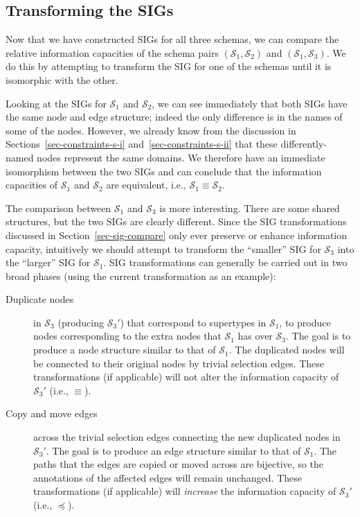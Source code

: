 \documentclass{sig-alternate-05-2015}
\newcounter{constraint}
\newcommand{\SC}[1]{\ensuremath{\mathcal{S}_{#1}}}
\newcommand{\Equivalent}[2]{\ensuremath{#1 \equiv #2}}
\begin{document}




\subsection{Transforming the SIGs}
\label{sec-transforming}

\noindent Now that we have constructed SIGs for all three schemas, we can compare the relative information capacities of the schema pairs \((\SC{1}, \SC{2})\) and \((\SC{1}, \SC{3})\). We do this by attempting to transform the SIG for one of the schemas until it is isomorphic with the other.

Looking at the SIGs for \(\SC{1}\) and \(\SC{2}\), we can see immediately that both SIGs have the same node and edge structure; indeed the only difference is in the names of some of the nodes. However, we already know from the discussion in Sections~\ref{sec-constraints-s-i} and~\ref{sec-constraints-s-ii} that these differently-named nodes represent the same domains. We therefore have an immediate isomorphism between the two SIGs and can conclude that the information capacities of \(\SC{1}\) and \(\SC{2}\) are equivalent, i.e., \(\Equivalent{\SC{1}}{\SC{2}}\).

The comparison between \(\SC{1}\) and \(\SC{3}\) is more interesting. There are some shared structures, but the two SIGs are clearly different. Since the SIG transformations discussed in Section~\ref{sec-sig-compare} only ever preserve or enhance information capacity, intuitively we should attempt to transform the ``smaller'' SIG for \(\SC{3}\) into the ``larger'' SIG for \(\SC{1}\). SIG transformations can generally be carried out in two broad phases (using the current transformation as an example):
\begin{description}

    \item[Duplicate nodes] in \(\SC{3}\) (producing \(\SC{3}'\)) that correspond to supertypes in \(\SC{1}\), to produce nodes corresponding to the extra nodes that \(\SC{1}\) has over \(\SC{3}\). The goal is to produce a node structure similar to that of \(\SC{1}\). The duplicated nodes will be connected to their original nodes by trivial selection edges. These transformations (if applicable) will not alter the information capacity of \(\SC{3}'\) (i.e., \(\equiv\)).
    
    \item[Copy and move edges] across the trivial selection edges connecting the new duplicated nodes in \(\SC{3}'\). The goal is to produce an edge structure similar to that of \(\SC{1}\). The paths that the edges are copied or moved across are bijective, so the annotations of the affected edges will remain unchanged. These transformations (if applicable) will \emph{increase} the information capacity of \(\SC{3}'\) (i.e., \(\preceq\)).
    
\end{description}
\end{document}
